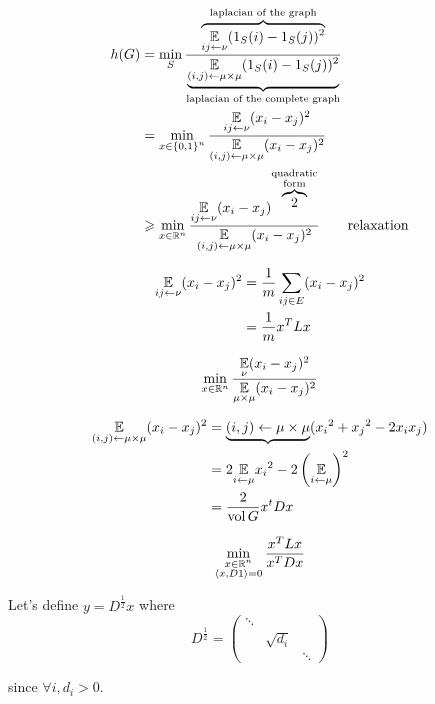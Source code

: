 \begin{proposition}
    \[
        \begin{aligned}
            h(G) &= \min\limits_{S} \frac{\overbrace{\underset{ij\leftarrow \nu}{\mathbb{E}}(1_S(i)-1_S(j))^2}^{\text{laplacian of the graph}}}{\underbrace{\underset{(i,j)\leftarrow\mu\times\mu}{\mathbb{E}}(1_S(i)-1_S(j))^2}_{\text{laplacian of the complete graph}}}\\
            &=\min\limits_{x\in\left\{ 0,1 \right\}^n} \frac{\underset{ij\leftarrow\nu}{\mathbb{E}}(x_i-x_j)^2}{\underset{(i,j)\leftarrow\mu\times\mu}{\mathbb{E}}(x_i-x_j)^2}\\
            &\geqslant \min\limits_{x\in\mathbb{R}^n} \frac{\underset{ij\leftarrow\nu}{\mathbb{E}}(x_i-x_j)^{\overbrace{2}^{\substack{\text{quadratic}\\\text{form}}}}}{\underset{(i,j)\leftarrow\mu\times\mu}{\mathbb{E}}(x_i-x_j)^2} \text{\qquad relaxation}
        \end{aligned}
    \]
\end{proposition}


\[
    \begin{aligned}
        \underset{ij\leftarrow\nu}{\mathbb{E}} (x_i-x_j)^2 &= \frac{1}{m} \sum\limits_{ij\in E} (x_i-x_j)^2\\
        &= \frac{1}{m} x^T L x
    \end{aligned}
\]

\[
    \min\limits_{x\in\mathbb{R}^n} \frac{\underset{\nu}{\mathbb{E}}(x_i-x_j)^2}{\underset{\mu\times\mu}{\mathbb{E}}(x_i-x_j)^2}
\]


\[
    \begin{aligned}
        \underset{(i,j) \leftarrow \mu\times\mu}{\mathbb{E}} (x_i-x_j)^2 &= \underbrace{(i,j)\leftarrow\mu\times\mu} ({x_i}^2+{x_j}^2-2x_ix_j)\\
        &= 2\underset{i\leftarrow \mu}{\mathbb{E}} {x_i}^2 - 2\left( \underset{i\leftarrow \mu}{\mathbb{E}}\right)^2\\
        &= \frac{2}{\operatorname{vol} G} x^t D x
    \end{aligned}
\]

\[
    \min\limits_{\substack{x\in\mathbb{R}^n\\\left\langle x,D1 \right\rangle=0}} \frac{x^TLx}{x^TDx}
\]


Let's define $y = D^{\frac{1}{2}} x$ where 
\[
    D^{\frac{1}{2}} = \left(\begin{matrix}
         \ddots \\
         & \sqrt{d_i}\\
         &&\ddots
    \end{matrix}\right)
\]

since $\forall i, d_i >0$.

